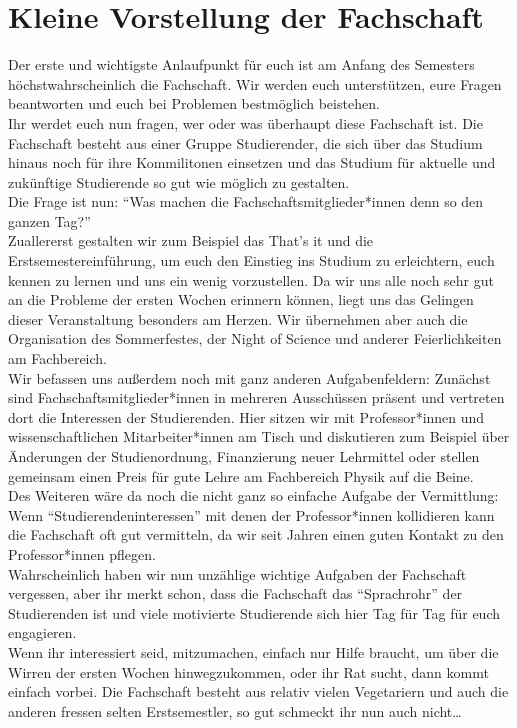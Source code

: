 \section[Die Fachschaft]{Kleine Vorstellung der Fachschaft}
Der erste und wichtigste Anlaufpunkt für euch ist am Anfang des Semesters höchstwahrscheinlich die Fachschaft.
Wir werden euch unterstützen, eure Fragen beantworten und euch bei Problemen bestmöglich beistehen.\\
Ihr werdet euch nun fragen, wer oder was überhaupt diese Fachschaft ist. Die Fachschaft besteht aus einer Gruppe Studierender, die sich über das Studium hinaus noch für ihre Kommilitonen einsetzen und das Studium für aktuelle und zukünftige Studierende so gut wie möglich zu gestalten.\\
Die Frage ist nun: \enquote{Was machen die Fachschaftsmitglieder*innen denn so den ganzen Tag?}\\
Zuallererst gestalten wir zum Beispiel das That's it und die Erstsemestereinführung, um euch den Einstieg ins Studium zu erleichtern, euch kennen zu lernen und uns ein wenig vorzustellen. Da wir uns alle noch sehr gut an die Probleme der ersten Wochen erinnern können, liegt uns das Gelingen dieser Veranstaltung besonders am Herzen. Wir übernehmen aber auch die Organisation des Sommerfestes, der Night of Science und anderer Feierlichkeiten am Fachbereich.\\
Wir befassen uns au\ss erdem noch mit ganz anderen Aufgabenfeldern:
Zunächst sind Fachschaftsmitglieder*innen in mehreren Ausschüssen präsent und vertreten dort die Interessen der Studierenden. Hier sitzen wir mit Professor*innen und wissenschaftlichen Mitarbeiter*innen am Tisch und diskutieren zum Beispiel über Änderungen der Studienordnung, Finanzierung neuer Lehrmittel oder stellen gemeinsam einen Preis für gute Lehre am Fachbereich Physik auf die Beine.\\
Des Weiteren wäre da noch die nicht ganz so einfache Aufgabe der Vermittlung:
Wenn \enquote{Studierendeninteressen} mit denen der Professor*innen kollidieren kann die Fachschaft oft gut vermitteln, da wir seit Jahren einen guten Kontakt zu den Professor*innen pflegen.\\
Wahrscheinlich haben wir nun unzählige wichtige Aufgaben der Fachschaft vergessen, aber ihr merkt schon, dass die Fachschaft das \enquote{Sprachrohr} der Studierenden ist und viele motivierte Studierende sich hier Tag für Tag für euch engagieren.\\
Wenn ihr interessiert seid, mitzumachen, einfach nur Hilfe braucht, um über die Wirren der ersten Wochen hinwegzukommen, oder ihr Rat sucht, dann kommt einfach vorbei. Die Fachschaft besteht aus relativ vielen Vegetariern und auch die anderen fressen selten Erstsemestler, so gut schmeckt ihr nun auch nicht\ldots\\
